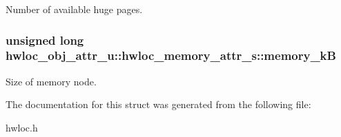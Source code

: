 Number of available huge pages. \hypertarget{structhwloc__obj__attr__u_1_1hwloc__memory__attr__s_acf44c5e36f6d156f8a19793715552e71}{
\subsubsection[{memory\_\-kB}]{\setlength{\rightskip}{0pt plus 5cm}unsigned long {\bf hwloc\_\-obj\_\-attr\_\-u::hwloc\_\-memory\_\-attr\_\-s::memory\_\-kB}}}
\label{structhwloc__obj__attr__u_1_1hwloc__memory__attr__s_acf44c5e36f6d156f8a19793715552e71}


Size of memory node. 

The documentation for this struct was generated from the following file:\begin{DoxyCompactItemize}
\item 
hwloc.h\end{DoxyCompactItemize}
